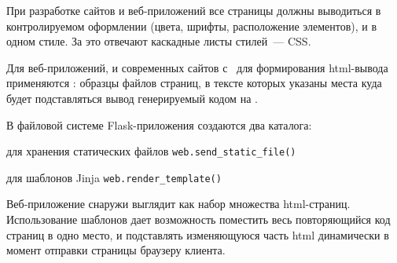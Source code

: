 
При разработке сайтов и веб-приложений все страницы должны выводиться в
контролируемом оформлении (цвета, шрифты, расположение элементов),
и в одном стиле. За это отвечают каскадные листы стилей\ --- CSS.

Для веб-приложений, и современных сайтов с \ для формирования html-вывода
применяются : образцы файлов страниц, в тексте которых указаны
места куда будет подставляться вывод генерируемый кодом на \py.

В файловой системе Flask-приложения создаются два каталога:
\begin{description}[nosep]
\item[static/] для хранения статических файлов
\verb|web.send_static_file()|
\item[templates/] для шаблонов Jinja \verb|web.render_template()|
\end{description}


Веб-приложение снаружи выглядит как набор множества html-страниц. Использование
шаблонов дает возможность поместить весь повторяющийся код страниц в одно место,
и подставлять изменяющуюся часть html динамически в момент отправки страницы
браузеру клиента.

\clearpage
{}
